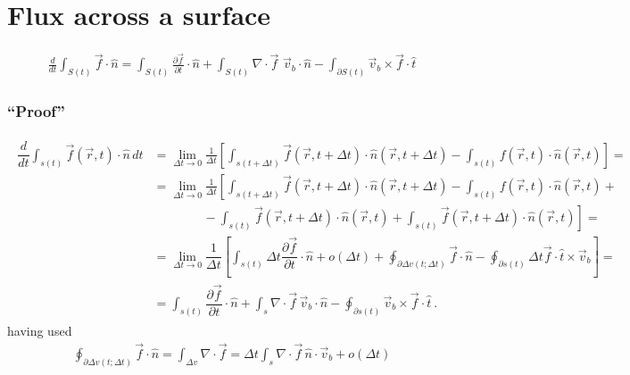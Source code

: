 \documentclass[letterpaper,10pt,english]{jupyterBook}
\begin{document}
\section{Flux across a surface}
\label{\detokenize{ch/tensor-algebra-calculus/time-derivative-of-integrals:flux-across-a-surface}}\label{\detokenize{ch/tensor-algebra-calculus/time-derivative-of-integrals:tensor-calculus-time-derivative-of-integrals-flux}}\begin{equation*}
\begin{split}\frac{d}{dt} \int_{S(t)} \vec{f} \cdot \hat{n} = \int_{S(t)} \frac{\partial \vec{f}}{\partial t} \cdot \hat{n} + \int_{S(t)} \nabla \cdot \vec{f} \,\, \vec{v}_b \cdot \hat{n} - \int_{\partial S(t)} \vec{v}_b \times \vec{f} \cdot \hat{t} \end{split}
\end{equation*}\subsubsection*{“Proof”}
\begin{equation*}
\begin{split}\begin{aligned}
  \dfrac{d}{dt} \int_{s(t)} \vec{f}(\vec{r}, t) \cdot \hat{n} \, dt 
  & = \lim_{\Delta t \rightarrow 0 } \frac{1}{\Delta t} \left[ \int_{s(t+\Delta t)} \vec{f}(\vec{r}, t+\Delta t) \cdot \hat{n}(\vec{r}, t+\Delta t) - \int_{s(t)} f(\vec{r}, t) \cdot \hat{n}(\vec{r}, t) \right] = \\
  & = \lim_{\Delta t \rightarrow 0 } \frac{1}{\Delta t} \left[ \int_{s(t+\Delta t)} \vec{f}(\vec{r}, t+\Delta t) \cdot \hat{n}(\vec{r}, t+\Delta t) - \int_{s(t)} f(\vec{r}, t) \cdot \hat{n}(\vec{r}, t) \right. + \\
  & \left. \qquad \qquad - \int_{s(t)} \vec{f}(\vec{r}, t + \Delta t) \cdot \hat{n}(\vec{r}, t) + \int_{s(t)} \vec{f}(\vec{r}, t + \Delta t) \cdot \hat{n}(\vec{r}, t) \right] = \\
  & = \lim_{\Delta t \rightarrow 0} \dfrac{1}{\Delta t} \left[ \int_{s(t)} \Delta t \dfrac{\partial \vec{f}}{\partial t} \cdot \hat{n} + o(\Delta t)  + \oint_{\partial \Delta v(t;\Delta t)} \vec{f} \cdot \hat{n} - \oint_{\partial s(t)} \Delta t \vec{f} \cdot \hat{t} \times \vec{v}_b \right]= \\
  & = \int_{s(t)} \dfrac{\partial \vec{f}}{\partial t} \cdot \hat{n} + \int_{s} \nabla \cdot \vec{f} \, \vec{v}_b \cdot \hat{n} - \oint_{\partial s(t)} \vec{v}_b \times \vec{f} \cdot \hat{t} \ .
\end{aligned}\end{split}
\end{equation*}
\sphinxAtStartPar
having used
\begin{equation*}
\begin{split}\oint_{\partial \Delta v(t;\Delta t)} \vec{f} \cdot \hat{n} = \int_{\Delta v} \nabla \cdot \vec{f} = \Delta t \int_{s} \nabla \cdot \vec{f} \, \hat{n} \cdot \vec{v}_b + o(\Delta t)\end{split}
\end{equation*}
\end{document}

